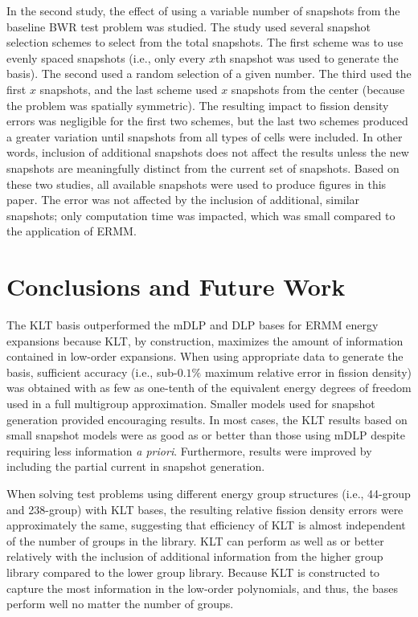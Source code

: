 \documentclass[5p,times,twocolumn,10pt]{elsarticle}
\begin{document}
    In the second study, the effect of using a variable number of snapshots from
    the baseline BWR test problem was studied. The study used several snapshot
    selection schemes to select from the total snapshots. The first scheme was
    to use evenly spaced snapshots (i.e., only every $x$th snapshot was used to
    generate the basis). The second used a random selection of a given number.
    The third used
    the first $x$ snapshots, and the last scheme used $x$ snapshots from the
    center (because the problem was spatially symmetric). The resulting impact
    to fission density errors was negligible for the first two schemes, but the
    last two schemes produced a greater variation until snapshots from all types
    of cells were included. In other words, inclusion of additional snapshots
    does not affect the results unless the new snapshots are meaningfully
    distinct
    from the current set of snapshots. Based on these two studies, all
    available snapshots were used to produce figures in this paper. The error
    was not affected by the inclusion of additional, similar snapshots; only
    computation time was impacted, which was small compared to the application
    of ERMM.

    \section{Conclusions and Future Work}

    The KLT basis outperformed the mDLP and DLP bases for ERMM energy
    expansions
    because KLT, by construction, maximizes the amount of information contained
    in low-order expansions. When using appropriate data to generate the basis,
    sufficient accuracy (i.e., sub-$0.1\%$ maximum relative error in fission
    density) was obtained with as few as one-tenth of the equivalent energy
    degrees of freedom used in a full multigroup approximation. Smaller models
    used for snapshot generation provided encouraging results. In most cases,
    the KLT results based on small snapshot models were as good as or better
than those using mDLP despite requiring less
    information {\it a priori}. Furthermore, results were improved by including
    the partial
    current in snapshot generation.

    When solving test problems using different energy group structures (i.e.,
44-group
    and 238-group) with KLT bases, the resulting relative fission density
    errors were approximately the same, suggesting
    that efficiency of KLT is almost independent of the number of groups in the
    library. KLT can perform as well as or better relatively with the inclusion
of
    additional information from the higher group library compared to the lower
    group library. Because KLT is constructed to capture the most information
    in the low-order polynomials, and thus, the bases perform well no matter
    the number of groups.
\end{document}
